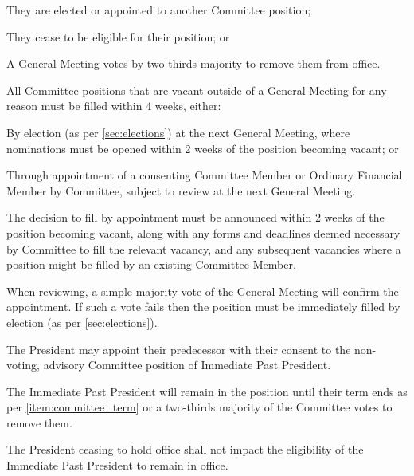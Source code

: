 \documentclass[a4paper]{article}
\begin{document}
\begin{myEnumerate}
\begin{myEnumerate}
            \item They are elected or appointed to another Committee position; 
            \item They cease to be eligible for their position; or
            \item A General Meeting votes by two-thirds majority to remove them from office.
        \end{myEnumerate}
    \item \label{item:vacancy} All Committee positions that are vacant outside of a General Meeting for any reason must be filled within 4 weeks, either:
        \begin{myEnumerate}
            \item By election (as per \cref{sec:elections}) at the next General Meeting, where nominations must be opened within 2 weeks of the position becoming vacant; or
            \item Through appointment of a consenting Committee Member or Ordinary Financial Member by Committee, subject to review at the next General Meeting.
                \begin{myEnumerate}
                    \item The decision to fill by appointment must be announced within 2 weeks of the position becoming vacant, along with any forms and deadlines deemed necessary by Committee to fill the relevant vacancy, and any subsequent vacancies where a position might be filled by an existing Committee Member.
                    \item When reviewing, a simple majority vote of the General Meeting will confirm the appointment. If such a vote fails then the position must be immediately filled by election (as per \cref{sec:elections}).
                \end{myEnumerate}
        \end{myEnumerate}
    \item The President may appoint their predecessor with their consent to the non-voting, advisory Committee position of Immediate Past President.
        \begin{myEnumerate}
            \item The Immediate Past President will remain in the position until their term ends as per \cref{item:committee_term} or a two-thirds majority of the Committee votes to remove them.
            \item The President ceasing to hold office shall not impact the eligibility of the Immediate Past President to remain in office.
        \end{myEnumerate}
\end{myEnumerate}
\end{document}

